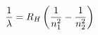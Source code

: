 \documentclass[preview]{standalone}
\begin{document}
\begin{align*}
\special{dvisvgm:raw <g id='unique000'>}\frac{1}{\lambda} = R_H\left(\frac{1}{n_1^2} - \frac{1}{n_2^2}\right)\special{dvisvgm:raw </g>}
\end{align*}
\end{document}

